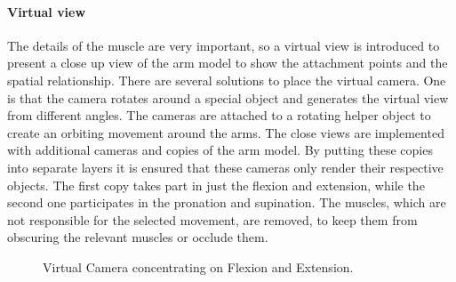 \paragraph{Virtual view}
The details of the muscle are very important, so a virtual view is introduced to present a close up view of the arm model to show the attachment points and the spatial relationship. There are several solutions to place the virtual camera. One is that the camera rotates around a special object and generates the virtual view from different angles. The cameras are attached to a rotating helper object to create an orbiting movement around the arms. 
The close views are implemented with additional cameras and copies of the arm model. By putting these copies into separate layers it is ensured that these cameras only render their respective objects. The first copy takes part in just the flexion and extension, while the second one participates in the pronation and supination. The muscles, which are not responsible for the selected movement, are removed, to keep them from obscuring the relevant muscles or occlude them.
\begin{figure}
	\centering
	
	\caption{Virtual Camera concentrating on Flexion and Extension.}
	\label{fig:3-IMR:MuscleLearningVirtualCamera}
\end{figure}

